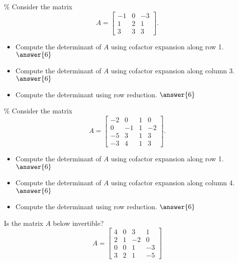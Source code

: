 \documentclass{ximera}
\begin{document}
\begin{exercise}\%
    Consider the matrix
    \begin{equation*}
        A = \begin{bmatrix}
        -1 & 0 & -3 \\ 1 & 2 & 1 \\ 3 & 3 & 3
        \end{bmatrix}.
    \end{equation*}
    \begin{itemize}
        \item Compute the determinant of $A$ using cofactor expansion along row 1. $\answer{6}$
        \item Compute the determinant of $A$ using cofactor expansion along column 3. $\answer{6}$
        \item Compute the determinant using row reduction. $\answer{6}$
    \end{itemize}
\end{exercise}


\begin{exercise}\%
    Consider the matrix
    \begin{equation*}
        A = \begin{bmatrix}
        -2 & 0 & 1 & 0 \\ 0 & -1 & 1 & -2 \\ -5 &3 & 1 & 3 \\ -3 & 4 & 1 & 3
        \end{bmatrix}.
    \end{equation*}
    \begin{itemize}
        \item Compute the determinant of $A$ using cofactor expansion along row 1. $\answer{6}$
        \item Compute the determinant of $A$ using cofactor expansion along column 4. $\answer{6}$
        \item Compute the determinant using row reduction. $\answer{6}$
    \end{itemize}
\end{exercise}



\begin{exercise}
    Is the matrix $A$ below invertible?%
    \[ A = \begin{bmatrix}4&0&3&1 \\ 2 &1&-2&0 \\ 0&0&1&-3 \\3 & 2 & 1 & -5 \end{bmatrix} \]
    \begin{multipleChoice}
    \end{multipleChoice}
\end{exercise}
\end{document}
